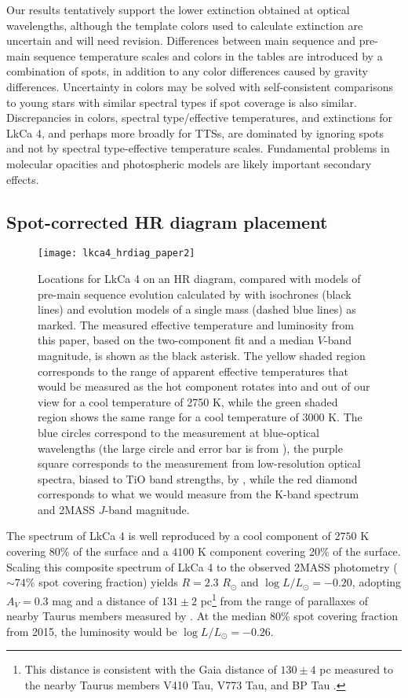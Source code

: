 \documentclass[twocolumn]{emulateapj}%
\begin{document}
Our results tentatively support the lower extinction obtained at optical wavelengths, although the template colors used to calculate extinction are uncertain and will need revision.  Differences between main sequence and pre-main sequence temperature scales and colors in the \citet{pecaut13} tables are introduced by a combination of spots, in addition to any color differences caused by gravity differences.
Uncertainty in colors may be solved with self-consistent comparisons to young stars with similar spectral types if spot coverage is also similar.  Discrepancies in colors, spectral type/effective temperatures, and extinctions for LkCa 4, and perhaps more broadly for TTSs, are dominated by ignoring spots and not by spectral type-effective temperature scales.  Fundamental problems in molecular opacities and photospheric models are likely important secondary effects.


\subsection{Spot-corrected HR diagram placement}

\begin{figure*}
 \centering
 \texttt{[image: lkca4\_hrdiag\_paper2]}
 \caption{Locations for LkCa 4 on an HR diagram, compared with models of pre-main sequence evolution calculated by \citet{baraffe15} with isochrones (black lines) and evolution models of a single mass (dashed blue lines) as marked.  The measured effective temperature and luminosity from this paper, based on the two-component fit and a median $V$-band magnitude, is shown as the black asterisk.  The yellow shaded region corresponds to the range of apparent effective temperatures that would be measured as the hot component rotates into and out of our view for a cool temperature of 2750 K, while the green shaded region shows the same range for a cool temperature of 3000 K.  The blue circles correspond to the measurement at blue-optical wavelengths (the large circle and error bar is from \citet{donati14}), the purple square corresponds to the measurement from low-resolution optical spectra, biased to TiO band strengths, by \citet[][biased to TiO bands]{herczeg14}, while the red diamond corresponds to what we would measure from the K-band spectrum and 2MASS $J$-band magnitude.}
 \label{fig:hrdiag}
\end{figure*}

The spectrum of LkCa 4 is well reproduced by a cool component of $2750$ K covering 80\% of the surface and a $4100$ K component covering 20\% of the surface.   Scaling this composite spectrum of LkCa 4 to the observed 2MASS photometry ($\sim 74\%$ spot covering fraction) yields $R=2.3$ $R_\odot$ and $\log L/L_\odot=-0.20$, adopting $A_V=0.3$ mag and a distance of $131 \pm 2$ pc\footnote{This distance is consistent with the Gaia distance of $130 \pm4$ pc measured to the nearby Taurus members V410 Tau, V773 Tau, and BP Tau \citep{gaia2016dr}.} from the range of parallaxes of nearby Taurus members measured by \citet{torres12}.  
At the median 80\% spot covering fraction from 2015, the luminosity would be $\log L/L_\odot=-0.26$.
\end{document}
